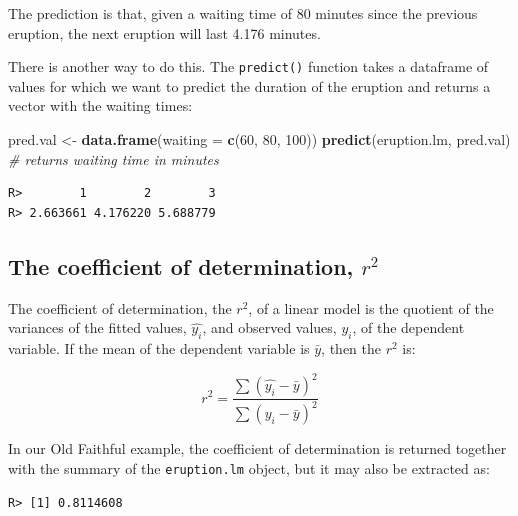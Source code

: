 \documentclass[english,10pt,a4paper,oneside]{book}
\newenvironment{Shaded}{\begin{snugshade}}{\end{snugshade}}
\newcommand{\KeywordTok}[1]{\textcolor[rgb]{0.13,0.29,0.53}{\textbf{#1}}}
\newcommand{\DataTypeTok}[1]{\textcolor[rgb]{0.13,0.29,0.53}{#1}}
\newcommand{\DecValTok}[1]{\textcolor[rgb]{0.00,0.00,0.81}{#1}}
\newcommand{\StringTok}[1]{\textcolor[rgb]{0.31,0.60,0.02}{#1}}
\newcommand{\CommentTok}[1]{\textcolor[rgb]{0.56,0.35,0.01}{\textit{#1}}}
\newcommand{\OperatorTok}[1]{\textcolor[rgb]{0.81,0.36,0.00}{\textbf{#1}}}
\newcommand{\NormalTok}[1]{#1}
\theoremstyle{definition}
\theoremstyle{definition}
\theoremstyle{definition}
\theoremstyle{remark}
\begin{document}
The prediction is that, given a waiting time of 80 minutes since the
previous eruption, the next eruption will last 4.176 minutes.

There is another way to do this. The \texttt{predict()} function takes a
dataframe of values for which we want to predict the duration of the
eruption and returns a vector with the waiting times:

\begin{Shaded}
\begin{Highlighting}[]
\NormalTok{pred.val <-}\StringTok{ }\KeywordTok{data.frame}\NormalTok{(}\DataTypeTok{waiting =} \KeywordTok{c}\NormalTok{(}\DecValTok{60}\NormalTok{, }\DecValTok{80}\NormalTok{, }\DecValTok{100}\NormalTok{))}
\KeywordTok{predict}\NormalTok{(eruption.lm, pred.val) }\CommentTok{# returns waiting time in minutes}
\end{Highlighting}
\end{Shaded}

\begin{verbatim}
R>        1        2        3 
R> 2.663661 4.176220 5.688779
\end{verbatim}

\subsection{\texorpdfstring{The coefficient of determination,
\(r^{2}\)}{The coefficient of determination, r\^{}\{2\}}}\label{the-coefficient-of-determination-r2}

The coefficient of determination, the \(r^{2}\), of a linear model is
the quotient of the variances of the fitted values, \(\hat{y_{i}}\), and
observed values, \(y_{i}\), of the dependent variable. If the mean of
the dependent variable is \(\bar y\), then the \(r^{2}\) is:

\[r^{2}=\frac{\sum(\hat{y_{i}} - \bar{y})^{2}}{\sum(y_{i} - \bar{y})^{2}}\]

In our Old Faithful example, the coefficient of determination is
returned together with the summary of the \texttt{eruption.lm} object,
but it may also be extracted as:

\begin{Shaded}
\end{Shaded}

\begin{verbatim}
R> [1] 0.8114608
\end{verbatim}
\end{document}
